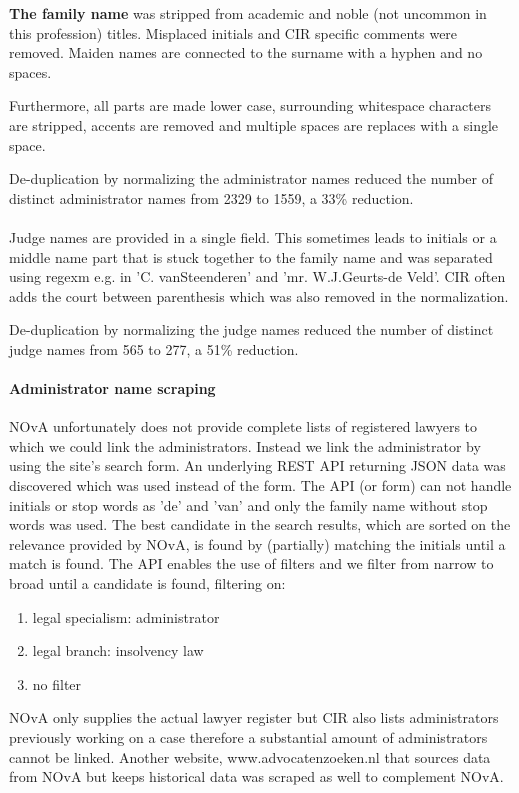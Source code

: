 \textbf{The family name} was stripped from academic and noble (not uncommon in this profession) titles. Misplaced initials and CIR specific comments were removed. Maiden names are connected to the surname with a hyphen and no spaces.

Furthermore, all parts are made lower case, surrounding whitespace characters are stripped, accents are removed and multiple spaces are replaces with a single space. 

De-duplication by normalizing the administrator names reduced the number of distinct administrator names from 2329 to 1559, a 33\% reduction.
\\\\
Judge names are provided in a single field. This sometimes leads to initials or a middle name part that is stuck together to the family name and was separated using regexm e.g. in 'C. vanSteenderen' and 'mr. W.J.Geurts-de Veld'. CIR often adds the court between parenthesis which was also removed in the normalization.

De-duplication by normalizing the judge names reduced the number of distinct judge names from 565 to 277, a 51\% reduction.

\paragraph{Administrator name scraping}
NOvA unfortunately does not provide complete lists of registered lawyers to which we could link the administrators. Instead we link the administrator by using the site's search form. An underlying REST API returning JSON data was discovered which was used instead of the form. The API (or form) can not handle initials or stop words as 'de' and 'van' and only the family name without stop words was used. The best candidate in the search results, which are sorted on the relevance provided by NOvA, is found by (partially) matching the initials until a match is found. The API enables the use of filters and we filter from narrow to broad until a candidate is found, filtering on: 
\begin{enumerate}
\item{legal specialism: administrator}
\item{legal branch: insolvency law}
\item{no filter}
\end{enumerate}

NOvA only supplies the actual lawyer register but CIR also lists administrators previously working on a case therefore a substantial amount of administrators cannot be linked. Another website, www.advocatenzoeken.nl that sources data from NOvA but keeps historical data was scraped as well to complement NOvA.

